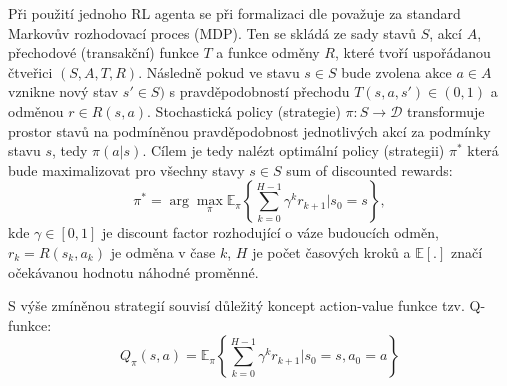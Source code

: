 \documentclass[czech, bc, kky, he, iso690alph]{fasthesis}
\begin{document}
            Při použití jednoho RL agenta se při formalizaci dle \cite{Deep_RL_survey, RLbook} považuje za standard Markovův rozhodovací proces (MDP). Ten se skládá ze sady stavů \(S\), akcí \(A\), přechodové (transakční) funkce \(T\) a funkce odměny \(R\), které tvoří uspořádanou čtveřici \((S, A, T, R)\). Následně pokud ve stavu \(s \in S\) bude zvolena akce \(a \in A\) vznikne nový stav \(s' \in S)\) s pravděpodobností přechodu \(T(s,a,s') \in (0,1)\) a odměnou \(r \in R(s,a)\). Stochastická policy (strategie) \(\pi : S \rightarrow \mathscr{D}\) transformuje prostor stavů na podmíněnou pravděpodobnost jednotlivých akcí za podmínky stavu \(s\), tedy \(\pi(a|s)\). Cílem je tedy nalézt optimální policy (strategii) \(\pi^{*}\) která bude maximalizovat pro všechny stavy \(s \in S\) sum of discounted rewards:
            	\begin{equation}
            		\pi^{*} = \arg \max_{\pi} \mathbb{E}_{\pi} \left\{\sum_{k=0}^{H-1}\gamma^{k}r_{k+1} | s_{0}=s\right\},
            	\end{equation}
            kde \(\gamma \in [0,1]\) je discount factor rozhodující o váze budoucích odměn, \(r_{k}=R(s_{k}, a_{k})\) je odměna v čase \(k\), \(H\) je počet časových kroků a \(\mathbb{E} [.]\) značí očekávanou hodnotu náhodné proměnné.
            
            S výše zmíněnou strategií souvisí důležitý koncept action-value funkce tzv. Q-funkce:
            	\begin{equation}
            		Q_{\pi}(s,a) = \mathbb{E}_{\pi} \left\{\sum_{k=0}^{H-1}\gamma^{k}r_{k+1} | s_{0}=s, a_{0}=a\right\}
            		\label{eqn:Q-function}
            	\end{equation}
\end{document}
